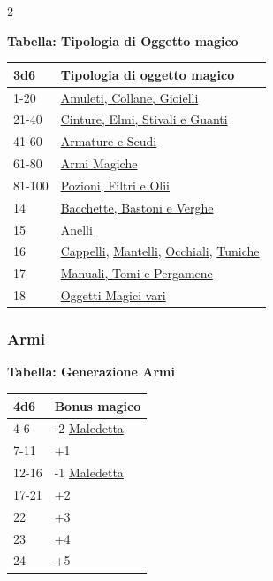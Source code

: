 \begin{multicols}{2}
{\medskip

\textbf{Tabella: Tipologia di Oggetto magico}\label{tipologiaoggettomagico}\hypertarget{tipologiaoggettomagico}{}

{\small \begin{tabularx}{\linewidth}{ll}
		\toprule
\rowcolor{gray!20}\textbf{3d6}& \textbf{Tipologia di oggetto magico}\\
\toprule
1-20 &\hyperlink{amuleticollanegioielli}{Amuleti, Collane, Gioielli}\\
\rowcolor{gray!20}21-40 &\hyperlink{cintureelmi}{Cinture, Elmi, Stivali e Guanti}\\
41-60 &\hyperlink{armatureescudi}{Armature e Scudi}\\
\rowcolor{gray!20}61-80 &\hyperlink{armimagiche}{Armi Magiche}\\
81-100 &\hyperlink{pozionifiltri}{Pozioni, Filtri e Olii}\\
\rowcolor{gray!20}14&\hyperlink{bastonibacchette}{Bacchette, Bastoni e Verghe}\\
15&\hyperlink{anellimagici}{Anelli}\\
\rowcolor{gray!20}16&\hyperlink{Cappelli}{Cappelli}, \hyperlink{Mantelli}{Mantelli}, \hyperlink{Occhiali da Notte}{Occhiali}, \hyperlink{Tuniche}{Tuniche}\\
17&\hyperlink{manualitomi}{Manuali, Tomi e Pergamene}\\
\rowcolor{gray!20}18&\hyperlink{oggettimagicivari}{Oggetti Magici vari}
\end{tabularx}}

\subsubsection{Armi}

\textbf{Tabella: Generazione Armi}\hypertarget{armimagiche}{}\label{armimagiche}

\medskip

{\small\begin{tabularx}{\linewidth}{ll}
		\toprule
\rowcolor{gray!20}\textbf{4d6} & \textbf{Bonus magico}\\
\toprule
4-6 & -2 \hyperlink{Arma maledetta}{Maledetta}\\
\rowcolor{gray!20}7-11 &+1\\
12-16 & -1 \hyperlink{Arma maledetta}{Maledetta}\\
\rowcolor{gray!20}17-21 & +2\\
22 & +3\\
\rowcolor{gray!20}23 & +4\\
24 &+5\\
\end{tabularx}}

}
\end{multicols}
